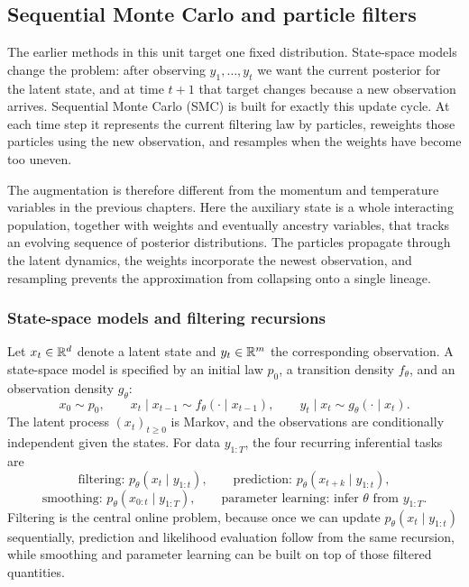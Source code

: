\subsection{Sequential Monte Carlo and particle filters}
\label{subsec:smc}

The earlier methods in this unit target one fixed distribution.
State-space models change the problem: after observing $y_1,\dots,y_t$ we want the current posterior for the latent state, and at time $t+1$ that target changes because a new observation arrives.
Sequential Monte Carlo (SMC) is built for exactly this update cycle.
At each time step it represents the current filtering law by particles, reweights those particles using the new observation, and resamples when the weights have become too uneven.

The augmentation is therefore different from the momentum and temperature variables in the previous chapters.
Here the auxiliary state is a whole interacting population, together with weights and eventually ancestry variables, that tracks an evolving sequence of posterior distributions.
The particles propagate through the latent dynamics, the weights incorporate the newest observation, and resampling prevents the approximation from collapsing onto a single lineage.

\subsubsection{State-space models and filtering recursions}
\label{subsubsec:smc-ssm}

Let $x_t\in\mathbb{R}^d$ denote a latent state and $y_t\in\mathbb{R}^m$ the corresponding observation.
A state-space model is specified by an initial law $p_0$, a transition density $f_\theta$, and an observation density $g_\theta$:
\begin{equation}
  x_0 \sim p_0,
  \qquad
  x_t \mid x_{t-1} \sim f_\theta(\cdot \mid x_{t-1}),
  \qquad
  y_t \mid x_t \sim g_\theta(\cdot \mid x_t).
  \label{eq:smc-ssm}
\end{equation}
The latent process $(x_t)_{t\ge 0}$ is Markov, and the observations are conditionally independent given the states.
For data $y_{1:T}$, the four recurring inferential tasks are
\[
  \text{filtering: } p_\theta(x_t \mid y_{1:t}),
  \qquad
  \text{prediction: } p_\theta(x_{t+k} \mid y_{1:t}),
\]
\[
  \text{smoothing: } p_\theta(x_{0:t} \mid y_{1:T}),
  \qquad
  \text{parameter learning: infer } \theta \text{ from } y_{1:T}.
\]
Filtering is the central online problem, because once we can update $p_\theta(x_t\mid y_{1:t})$ sequentially, prediction and likelihood evaluation follow from the same recursion, while smoothing and parameter learning can be built on top of those filtered quantities.

